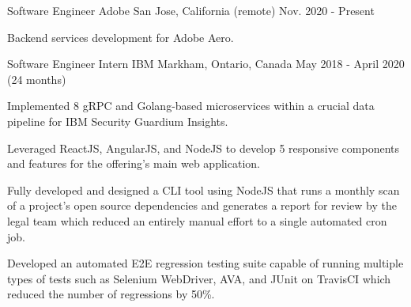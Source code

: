 


\begin{cventries}


\cventry
{Software Engineer} %
{Adobe} %
{San Jose, California (remote)} %
{Nov. 2020 - Present} %
{ %
\begin{cvitems}
\item {Backend services development for Adobe Aero.}
\end{cvitems}
}


\cventry
{Software Engineer Intern} %
{IBM} %
{Markham, Ontario, Canada} %
{May 2018 - April 2020 (24 months)} %
{ %
\begin{cvitems}
\item {Implemented 8 gRPC and Golang-based microservices within a crucial data pipeline for IBM Security Guardium Insights.}
\item {Leveraged ReactJS, AngularJS, and NodeJS to develop 5 responsive components and features for the offering's main web application.}
\item {Fully developed and designed a CLI tool using NodeJS that runs a monthly scan of a project's open source dependencies and generates a report for review by the legal team which reduced an entirely manual effort to a single automated cron job.}
\item {Developed an automated E2E regression testing suite capable of running multiple types of tests such as Selenium WebDriver, AVA, and JUnit on TravisCI which reduced the number of regressions by 50\%.}
\end{cvitems}
}


\end{cventries}